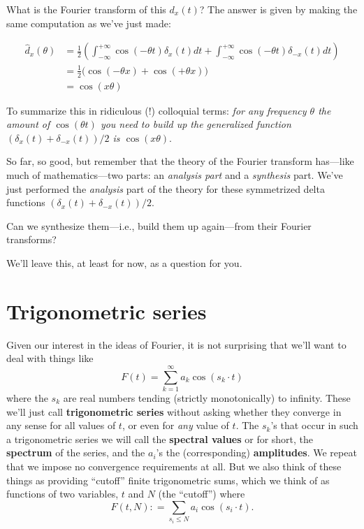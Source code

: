 \documentclass[openany]{book}
\theoremstyle{plain}
\theoremstyle{definition}
\begin{document}
    What is the Fourier transform of this $d_x(t)$?  The answer is
    given by making the same computation as we've just made:
    
\begin{align*}\label{dx}
{\hat d_x}(\theta)  &=  {\frac{1}{2}}\left(\int_{-\infty}^{+\infty}\cos(-\theta t)\delta_x(t)dt + \int_{-\infty}^{+\infty}\cos(-\theta t)\delta_{-x}(t)dt\right)\\
    &= {\frac{1}{2}}\big(\cos(-\theta x)+ \cos(+\theta x)\big)\\
    &= \cos(x\theta)
\end{align*}

    
To summarize this in ridiculous (!) colloquial terms: {\it for any
  frequency $\theta$ the amount of $\cos(\theta t)$ you need to build
  up the generalized function $(\delta_x(t) + \delta_{-x}(t))/2$ is
  $\cos(x\theta).$ }

    
So far, so good, but remember that the theory of the Fourier transform
has---like much of mathematics---two parts: an {\it analysis part} and
a {\it synthesis} part.  We've just performed the {\it analysis} part
of the theory for these symmetrized delta functions $(\delta_x(t) +
\delta_{-x}(t))/2$.

Can we synthesize them---i.e., build them up again---from their Fourier transforms?
  
  
  We'll leave this, at least for now, as a question for you. 




\chapter{Trigonometric series} 
Given our interest in the ideas of Fourier, it is not surprising that
we'll want to deal with things like $$F(t) = \sum_{k=1}^{\infty}
a_k\cos(s_k\cdot t)$$ where the $s_k$ are real numbers tending
(strictly monotonically) to infinity.  These we'll just call {\bf
  trigonometric series} without asking whether they converge in any
sense for all values of $t$, or even for {\it any} value of $t$. The
$s_k$'s that occur in such a trigonometric series we will call the
{\bf spectral values} or for short, the {\bf spectrum} of the series,
and the $a_i$'s the (corresponding) {\bf amplitudes}.  We repeat that
we impose no convergence requirements at all. But we also think of
these things as providing ``cutoff'' finite trigonometric sums, which
we think of as functions of two variables, $t$ and $N$ (the
``cutoff'') where $$F(t,N): = \sum_{s_i\le N} a_i\cos(s_i\cdot t).$$
\end{document}
